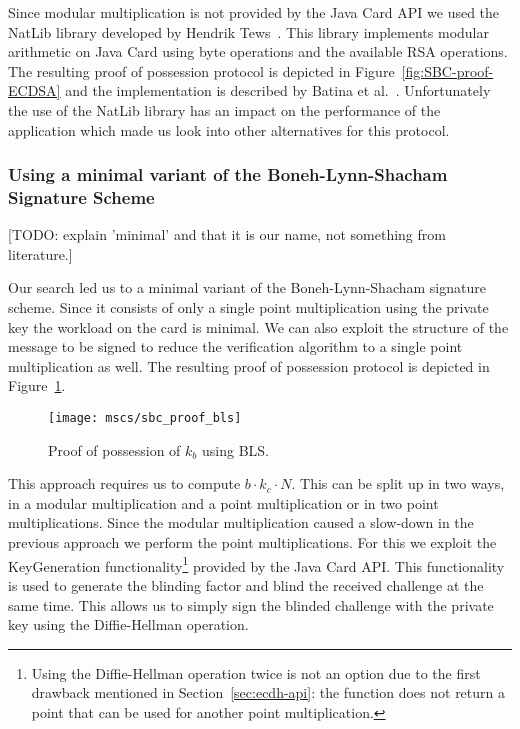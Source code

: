 Since modular multiplication is not provided by the Java Card API we used the
NatLib library developed by Hendrik Tews~\cite{TewsJacobs09}. This library
implements modular arithmetic on Java Card using byte operations and the
available RSA operations. The resulting proof of possession protocol is depicted
in Figure~\ref{fig:SBC-proof-ECDSA} and the implementation is described by
Batina et al.~\cite{BatinaHJMV10}. Unfortunately the use of the NatLib library
has an impact on the performance of the application which made us look into
other alternatives for this protocol.

\subsubsection{Using a minimal variant of the Boneh-Lynn-Shacham Signature Scheme}

[TODO: explain 'minimal' and that it is our name, not something from literature.]

Our search led us to a minimal variant of the Boneh-Lynn-Shacham signature
scheme. Since it consists of only a single point multiplication using the
private key the workload on the card is minimal. We can also exploit the
structure of the message to be signed to reduce the verification algorithm to a
single point multiplication as well. The resulting proof of possession protocol
is depicted in Figure~\ref{fig:SBC-proof-BLS}.

\begin{figure}[ht]
  \centering
  \texttt{[image: mscs/sbc\_proof\_bls]}
  \caption{Proof of possession of $k_b$ using BLS.}
  \label{fig:SBC-proof-BLS}
\end{figure}

This approach requires us to compute $b \cdot k_c \cdot N$. This can be split
up in two ways, in a modular multiplication and a point multiplication or in two
point multiplications. Since the modular multiplication caused a slow-down in
the previous approach we perform the point multiplications. For this we exploit
the KeyGeneration functionality\footnote{Using the Diffie-Hellman operation
twice is not an option due to the first drawback mentioned in
Section~\ref{sec:ecdh-api}: the function does not return a point that can be used
for another point multiplication.} provided by the Java Card API. This
functionality is used to generate the blinding factor and blind the received
challenge at the same time. This allows us to simply sign the blinded challenge
with the private key using the Diffie-Hellman operation.

